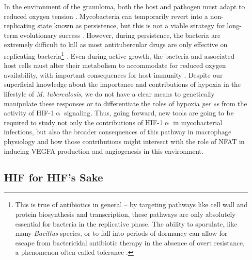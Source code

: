 In the environment of the granuloma, both the host and pathogen must adapt to reduced oxygen tension \citep{Prosser2017}. Mycobacteria can temporarily revert into a non\hyp{}replicating state known as persistence, but this is not a viable strategy for long\hyp{}term evolutionary success \citep{Manabe2000, zuBentrup2001, Stewart2003, Pandey2008, Ehrt2018}. However, during persistence, the bacteria are extremely difficult to kill as most antitubercular drugs are only effective on replicating bacteria\footnote{This is true of antibiotics in general -- by targeting pathways like cell wall and protein biosynthesis and transcription, these pathways are only absolutely essential for bacteria in the replicative phase. The ability to sporulate, like many \textit{Bacillus} species, or to fall into periods of dormancy can allow for escape from bactericidal antibiotic therapy in the absence of overt resistance, a phenomenon often called tolerance \citep{Higgins2012, Meredith2015, LevinReisman2017, Westblade2020}.} \citep{Veatch2018}. Even during active growth, the bacteria and associated host cells must alter their metabolism to accommodate for reduced oxygen availability, with important consequences for host immunity \citep{Tsai2006, Rustad2009, Harper2012, Galagan2013, Prosser2017}. Despite our superficial knowledge about the importance and contributions of hypoxia in the lifestyle of \textit{M. tuberculosis}, we do not have a clear means to genetically manipulate these responses or to differentiate the roles of hypoxia \textit{per se} from the activity of HIF\hyp{}1$\upalpha$ signaling. Thus, going forward, new tools are going to be required to study not only the contributions of HIF\hyp{}1$\upalpha$ in mycobacterial infections, but also the broader consequences of this pathway in macrophage physiology and how those contributions might intersect with the role of NFAT in inducing VEGFA production and angiogenesis in this environment.

\subsection{HIF for HIF's Sake}\label{hif4hif}


